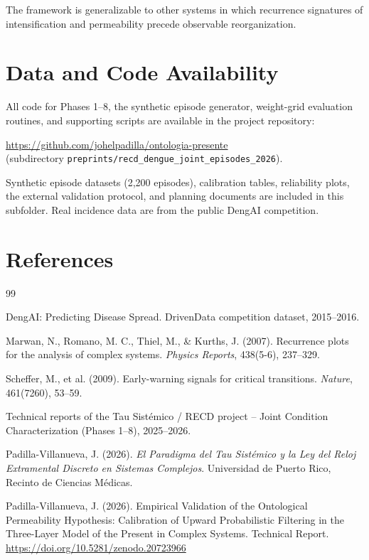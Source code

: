 \documentclass[11pt,a4paper]{article}
\begin{document}
The framework is generalizable to other systems in which recurrence signatures of intensification and permeability precede observable reorganization.

\section*{Data and Code Availability}

\begin{sloppypar}
All code for Phases 1--8, the synthetic episode generator, weight-grid evaluation routines, and supporting scripts are available in the project repository:

\url{https://github.com/johelpadilla/ontologia-presente}\\
(subdirectory \texttt{preprints/recd\_dengue\_joint\_episodes\_2026}).

Synthetic episode datasets (2,200 episodes), calibration tables, reliability plots, the external validation protocol, and planning documents are included in this subfolder. Real incidence data are from the public DengAI competition.
\end{sloppypar}

\section*{References}
\begin{thebibliography}{99}

DengAI: Predicting Disease Spread. DrivenData competition dataset, 2015--2016.

Marwan, N., Romano, M. C., Thiel, M., \& Kurths, J. (2007). Recurrence plots for the analysis of complex systems. \textit{Physics Reports}, 438(5-6), 237--329.

Scheffer, M., et al. (2009). Early-warning signals for critical transitions. \textit{Nature}, 461(7260), 53--59.

Technical reports of the Tau Sistémico / RECD project – Joint Condition Characterization (Phases 1--8), 2025--2026.

Padilla-Villanueva, J. (2026). \textit{El Paradigma del Tau Sistémico y la Ley del Reloj Extramental Discreto en Sistemas Complejos}. Universidad de Puerto Rico, Recinto de Ciencias Médicas.

Padilla-Villanueva, J. (2026). Empirical Validation of the Ontological Permeability Hypothesis: Calibration of Upward Probabilistic Filtering in the Three-Layer Model of the Present in Complex Systems. Technical Report. \url{https://doi.org/10.5281/zenodo.20723966}

\end{thebibliography}
\end{document}
